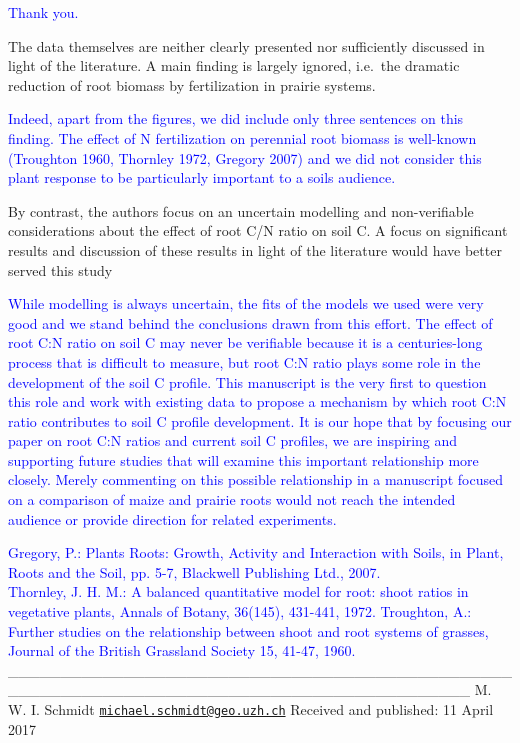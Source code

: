 \documentclass[]{article}
\begin{document}
\textcolor{blue}{Thank you.}

The data themselves are neither clearly presented nor sufficiently
discussed in light of the literature. A main finding is largely ignored,
i.e.~the dramatic reduction of root biomass by fertilization in prairie
systems.

\textcolor{blue}{Indeed, apart from the figures, we did include only three sentences on this finding. The effect of N fertilization on perennial root biomass is well-known (Troughton 1960, Thornley 1972, Gregory 2007) and we did not consider this plant response to be particularly important to a soils audience.}

By contrast, the authors focus on an uncertain modelling and
non-verifiable considerations about the effect of root C/N ratio on soil
C. A focus on significant results and discussion of these results in
light of the literature would have better served this study

\textcolor{blue}{While modelling is always uncertain, the fits of the models we used were very good and we stand behind the conclusions drawn from this effort. The effect of root C:N ratio on soil C may never be verifiable because it is a centuries-long process that is difficult to measure, but root C:N ratio plays some role in the development of the soil C profile. This manuscript is the very first to question this role and work with existing data to propose a mechanism by which root C:N ratio contributes to soil C profile development. It is our hope that by focusing our paper on root C:N ratios and current soil C profiles, we are inspiring and supporting future studies that will examine this important relationship more closely. Merely commenting on this possible relationship in a manuscript focused on a comparison of maize and prairie roots would not reach the intended audience or provide direction for related experiments.}

\textcolor{blue}{Gregory, P.: Plants Roots: Growth, Activity and Interaction with Soils, in Plant, Roots and the Soil, pp. 5-7, Blackwell Publishing Ltd., 2007.}\\
\textcolor{blue}{Thornley, J. H. M.: A balanced quantitative model for root: shoot ratios in vegetative plants, Annals of Botany, 36(145), 431-441, 1972.}
\textcolor{blue}{Troughton, A.: Further studies on the relationship between shoot and root systems of grasses, Journal of
the British Grassland Society 15, 41-47, 1960.}
\_\_\_\_\_\_\_\_\_\_\_\_\_\_\_\_\_\_\_\_\_\_\_\_\_\_\_\_\_\_\_\_\_\_\_\_\_\_\_\_\_\_\_\_\_\_\_\_\_\_\_\_\_\_\_\_\_\_\_\_\_\_\_\_\_\_\_\_\_\_\_\_\_\_\_\_\_\_\_\_\_\_\_\_\_\_\_\_\_\_\_\_
M. W. I. Schmidt
\href{mailto:michael.schmidt@geo.uzh.ch}{\nolinkurl{michael.schmidt@geo.uzh.ch}}
Received and published: 11 April 2017
\end{document}
